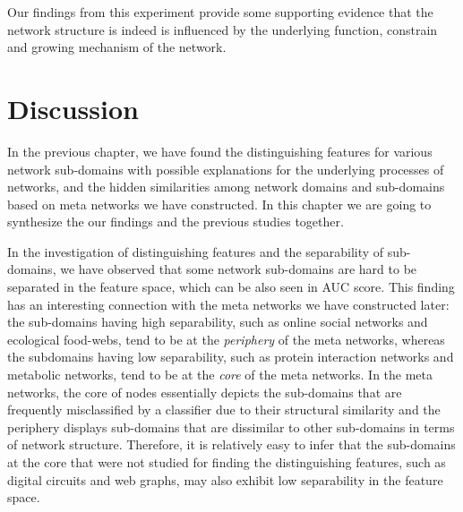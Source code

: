 \documentclass{article}
\begin{document}
Our findings from this experiment provide some supporting evidence that the network structure is indeed is influenced by the underlying function, constrain and growing mechanism of the network. 

\section{Discussion}
In the previous chapter, we have found the distinguishing features for various network sub-domains with possible explanations for the underlying processes of networks, and the hidden similarities among network domains and sub-domains based on meta networks we have constructed. In this chapter we are going to synthesize the our findings and the previous studies together.

In the investigation of distinguishing features and the separability of sub-domains, we have observed that some network sub-domains are hard to be separated in the feature space, which can be also seen in AUC score. This finding has an interesting connection with the meta networks we have constructed later: the sub-domains having high separability, such as online social networks and ecological food-webs, tend to be at the \textit{periphery} of the meta networks, whereas the subdomains having low separability, such as protein interaction networks and metabolic networks, tend to be at the \textit{core} of the meta networks. In the meta networks, the core of nodes essentially depicts the sub-domains that are frequently misclassified by a classifier due to their structural similarity and the periphery displays sub-domains that are dissimilar to other sub-domains in terms of network structure. Therefore, it is relatively easy to infer that the sub-domains at the core that were not studied for finding the distinguishing features, such as digital circuits and web graphs, may also exhibit low separability in the feature space. 
\end{document}
